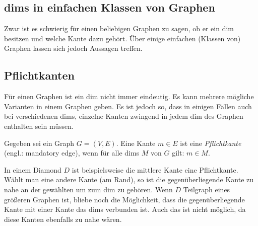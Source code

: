 \subsection{dims in einfachen Klassen von Graphen}
Zwar ist es schwierig für einen beliebigen Graphen zu sagen, ob er ein dim besitzen und welche Kante dazu gehört. Über einige einfachen (Klassen von) Graphen lassen sich jedoch Aussagen treffen.

\subsection{Pflichtkanten}

Für einen Graphen ist ein dim nicht immer eindeutig. Es kann mehrere mögliche Varianten in einem Graphen geben. Es ist jedoch so, dass in einigen Fällen auch bei verschiedenen dims, einzelne Kanten zwingend in jedem dim des Graphen enthalten sein müssen.

\begin{mydef}[Pflichtkante]
Gegeben sei ein Graph $G=(V,E)$. Eine Kante $m\in E$ ist eine \emph{Pflichtkante} (engl.: mandatory edge), wenn für alle dims $M$ von $G$ gilt: $m\in M$.
\end{mydef}

In einem Diamond $D$ ist beispielsweise die mittlere Kante eine Pflichtkante. Wählt man eine andere Kante (am Rand), so ist die gegenüberliegende Kante zu nahe an der gewählten um zum dim zu gehören. Wenn $D$ Teilgraph eines größeren Graphen ist, bliebe noch die Möglichkeit, dass die gegenüberliegende Kante mit einer Kante das dims verbunden ist. Auch das ist nicht möglich, da diese Kanten ebenfalls zu nahe wären.


